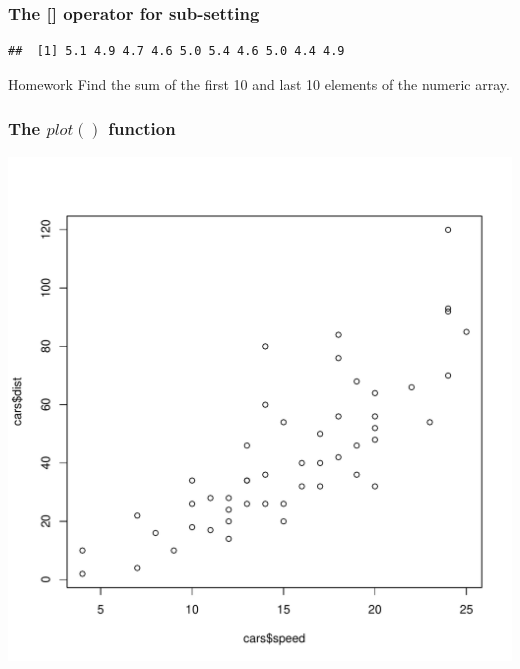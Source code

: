 \subsubsection{The [] operator for sub-setting}
\begin{knitrout}
\color{fgcolor}\begin{kframe}
\begin{alltt}
\hlopt{$}\hlstd{Sepal.Length[}\hlopt{:}\hlstd{]}
\end{alltt}
\begin{verbatim}
##  [1] 5.1 4.9 4.7 4.6 5.0 5.4 4.6 5.0 4.4 4.9
\end{verbatim}
\end{kframe}
\end{knitrout}

\begin{DIY}{Homework}
Find the sum of the first 10 and last 10 elements of the numeric array.
\end{DIY}

\subsubsection{The $plot()$ function}
\begin{knitrout}
\color{fgcolor}\begin{kframe}
\begin{alltt}
\hlopt{$}\hlopt{$}
\end{alltt}
\end{kframe}
\includegraphics[width=\maxwidth]{figure/plot-1} 

\end{knitrout}


